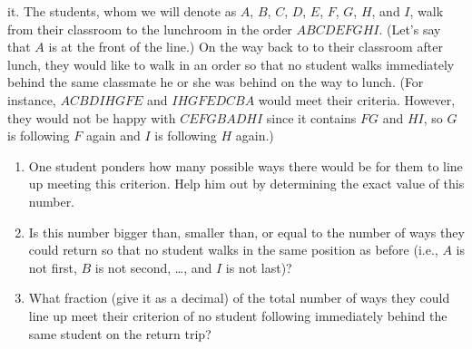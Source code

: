 \begin{enumerate}
  it. The students, whom we will denote as $A$, $B$, $C$, $D$, $E$,
  $F$, $G$, $H$, and $I$, walk from their classroom to the lunchroom
  in the order $ABCDEFGHI$. (Let's say that $A$ is at the front of the
  line.) On the way back to to their classroom after lunch, they would
  like to walk in an order so that no student walks immediately behind
  the same classmate he or she was behind on the way to lunch. (For
  instance, $ACBDIHGFE$ and $IHGFEDCBA$ would meet their
  criteria. However, they would not be happy with $CEFGBADHI$ since it
  contains $FG$ and $HI$, so $G$ is following $F$ again and $I$ is
  following $H$ again.) 
  \begin{enumerate}
  \item One student ponders how many possible ways there would be for
    them to line up meeting this criterion. Help him out by
    determining the exact value of this number.
  \item Is this number bigger than, smaller than, or equal to the
    number of ways they could return so that no student walks in the
    same position as before (i.e., $A$ is not first, $B$ is not
    second, \dots, and $I$ is not last)?
  \item What fraction (give it as a decimal) of the total
    number of ways they could line up meet their criterion of no
    student following immediately behind the same student on the
    return trip?
 \end{enumerate}
\end{enumerate}

